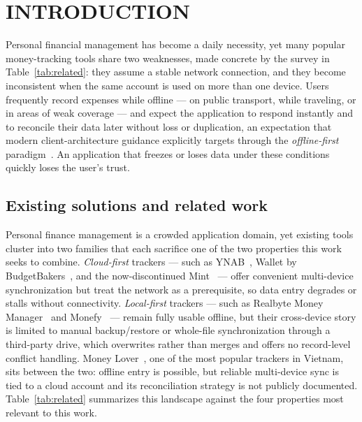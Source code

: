 \documentclass[13pt,a4paper]{extarticle}
\begin{document}
\section{INTRODUCTION}

Personal financial management has become a daily necessity, yet many popular money-tracking tools
share two weaknesses, made concrete by the survey in Table~\ref{tab:related}: they assume a stable
network connection, and they become inconsistent when the same account is used on more than one
device. Users frequently record expenses while offline --- on public transport, while traveling, or
in areas of weak coverage --- and expect the application to respond instantly and to reconcile their
data later without loss or duplication, an expectation that modern client-architecture guidance
explicitly targets through the \textit{offline-first} paradigm~\cite{android-offline}. An
application that freezes or loses data under these conditions quickly loses the user's trust.

\subsection{Existing solutions and related work}
Personal finance management is a crowded application domain, yet existing tools cluster into two
families that each sacrifice one of the two properties this work seeks to combine.
\emph{Cloud-first} trackers --- such as YNAB~\cite{ynab}, Wallet by BudgetBakers~\cite{wallet}, and
the now-discontinued Mint~\cite{mint} --- offer convenient multi-device synchronization but treat the
network as a prerequisite, so data entry degrades or stalls without connectivity.
\emph{Local-first} trackers --- such as Realbyte Money Manager~\cite{moneymanager} and
Monefy~\cite{monefy} --- remain fully usable offline, but their cross-device story is limited to
manual backup/restore or whole-file synchronization through a third-party drive, which overwrites
rather than merges and offers no record-level conflict handling. Money Lover~\cite{moneylover}, one
of the most popular trackers in Vietnam, sits between the two: offline entry is possible, but reliable
multi-device sync is tied to a cloud account and its reconciliation strategy is not publicly
documented. Table~\ref{tab:related} summarizes this landscape against the four properties most
relevant to this work.
\end{document}

